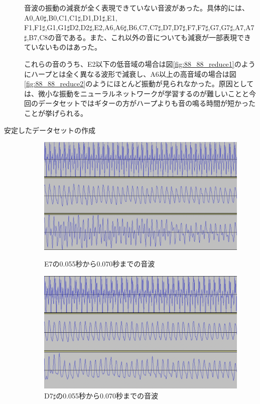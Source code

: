 \begin{description}
音波の振動の減衰が全く表現できていない音波があった。具体的には、A0,A0$\sharp$,B0,C1,C1$\sharp$,D1,D1$\sharp$,E1,\\
F1,F1$\sharp$,G1,G1$\sharp$D2,D2$\sharp$,E2,A6,A6$\sharp$,B6,C7,C7$\sharp$,D7,D7$\sharp$,F7,F7$\sharp$,G7,G7$\sharp$,A7,A7$\sharp$,B7,C8の音である。また、これ以外の音についても減衰が一部表現できていないものはあった。

これらの音のうち、E2以下の低音域の場合は図\ref{fig:88_88_reduce1}のようにハープとは全く異なる波形で減衰し、A6以上の高音域の場合は図\ref{fig:88_88_reduce2}のようにほとんど振動が見られなかった。原因としては、微小な振動をニューラルネットワークが学習するのが難しいことと今回のデータセットではギターの方がハープよりも音の鳴る時間が短かったことが挙げられる。

\item[安定したデータセットの作成]\mbox{}

\begin{figure}[t]
\begin{center}
\begin{minipage}{0.48\hsize}
\begin{center}
\includegraphics[width=0.9\hsize]{figure/88_88_det/e7_0550_0700.png}
\caption{E7の0.055秒から0.070秒までの音波}
\label{fig:88_88_bad1}
\end{center}
\end{minipage}
\begin{minipage}{0.48\hsize}
\begin{center}
\includegraphics[width=0.9\hsize]{figure/88_88_det/d7s_0550_0700.png}
\caption{D7$\sharp$の0.055秒から0.070秒までの音波}
\label{fig:88_88_bad2}
\end{center}
\end{minipage}
\end{center}
\end{figure}


\end{description}
